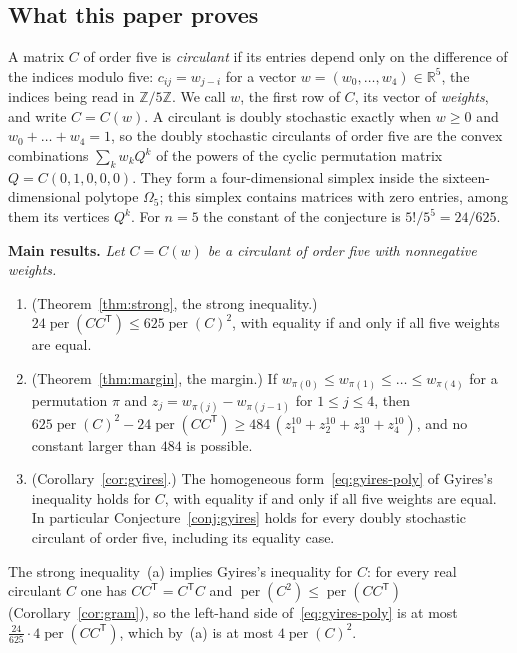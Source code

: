 \documentclass[11pt,a4paper]{article}
\theoremstyle{definition}
\theoremstyle{remark}
\newcommand{\R}{\mathbb{R}}
\newcommand{\Z}{\mathbb{Z}}
\newcommand{\per}{\operatorname{per}}
\newcommand{\T}{\mathsf{T}}
\newcommand{\para}[1]{\par\medskip\noindent\textbf{#1}\enspace}
\begin{document}
\subsection{What this paper proves}
A matrix $C$ of order five is \emph{circulant} if its entries depend only on the difference of the indices modulo five:
$c_{ij}=w_{j-i}$ for a vector $w=(w_0,\dots,w_4)\in\R^5$, the indices being read in $\Z/5\Z$. We call $w$, the first
row of $C$, its vector of \emph{weights}, and write $C=C(w)$. A circulant is doubly stochastic exactly when $w\ge0$ and
$w_0+\dots+w_4=1$, so the doubly stochastic circulants of order five are the convex combinations $\sum_k w_kQ^k$ of
the powers of the cyclic permutation matrix $Q=C(0,1,0,0,0)$. They form a four-dimensional simplex inside the
sixteen-dimensional polytope $\Omega_5$; this simplex contains matrices with zero entries, among them its vertices
$Q^k$. For $n=5$ the constant of the conjecture is $5!/5^5=24/625$.

\para{Main results.} \emph{Let $C=C(w)$ be a circulant of order five with nonnegative weights.}
\begin{enumerate}[label=(\alph*)]
\item (Theorem~\ref{thm:strong}, the strong inequality.) $24\per(CC^\T)\le625\per(C)^2$, with equality if and only if
all five weights are equal.
\item (Theorem~\ref{thm:margin}, the margin.) If $w_{\pi(0)}\le w_{\pi(1)}\le\dots\le w_{\pi(4)}$ for a permutation
$\pi$ and $z_j=w_{\pi(j)}-w_{\pi(j-1)}$ for $1\le j\le4$, then
$625\per(C)^2-24\per(CC^\T)\ge484\,(z_1^{10}+z_2^{10}+z_3^{10}+z_4^{10})$, and no constant larger than $484$ is
possible.
\item (Corollary~\ref{cor:gyires}.) The homogeneous form~\eqref{eq:gyires-poly} of Gyires's inequality holds for $C$,
with equality if and only if all five weights are equal. In particular Conjecture~\ref{conj:gyires} holds for every
doubly stochastic circulant of order five, including its equality case.
\end{enumerate}
The strong inequality~(a) implies Gyires's inequality for $C$: for every real circulant $C$ one has $CC^\T=C^\T C$
and $\per(C^2)\le\per(CC^\T)$ (Corollary~\ref{cor:gram}), so the left-hand side of~\eqref{eq:gyires-poly} is at most
$\frac{24}{625}\cdot4\per(CC^\T)$, which by~(a) is at most $4\per(C)^2$.
\end{document}
